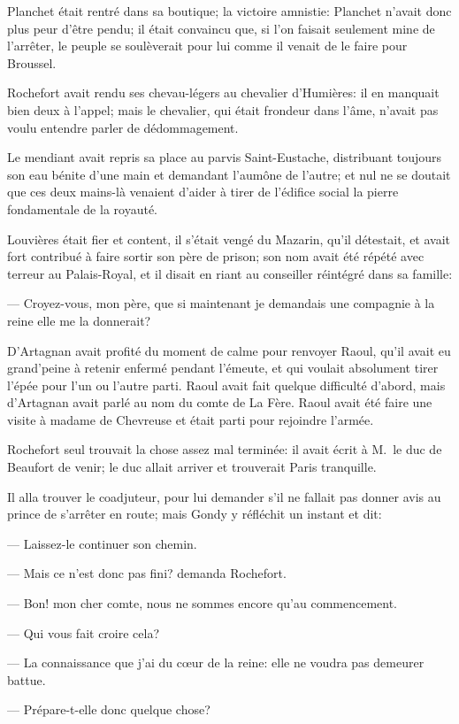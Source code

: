 Planchet était rentré dans sa boutique; la victoire amnistie: Planchet n'avait donc plus peur d'être pendu; il était convaincu que, si l'on faisait seulement mine de l'arrêter, le peuple se soulèverait pour lui comme il venait de le faire pour Broussel.

Rochefort avait rendu ses chevau-légers au chevalier d'Humières: il en manquait bien deux à l'appel; mais le chevalier, qui était frondeur dans l'âme, n'avait pas voulu entendre parler de dédommagement.

Le mendiant avait repris sa place au parvis Saint-Eustache, distribuant toujours son eau bénite d'une main et demandant l'aumône de l'autre; et nul ne se doutait que ces deux mains-là venaient d'aider à tirer de l'édifice social la pierre fondamentale de la royauté.

Louvières était fier et content, il s'était vengé du Mazarin, qu'il détestait, et avait fort contribué à faire sortir son père de prison; son nom avait été répété avec terreur au Palais-Royal, et il disait en riant au conseiller réintégré dans sa famille:

— Croyez-vous, mon père, que si maintenant je demandais une compagnie à la reine elle me la donnerait?

D'Artagnan avait profité du moment de calme pour renvoyer Raoul, qu'il avait eu grand'peine à retenir enfermé pendant l'émeute, et qui voulait absolument tirer l'épée pour l'un ou l'autre parti. Raoul avait fait quelque difficulté d'abord, mais d'Artagnan avait parlé au nom du comte de La Fère. Raoul avait été faire une visite à madame de Chevreuse et était parti pour rejoindre l'armée.

Rochefort seul trouvait la chose assez mal terminée: il avait écrit à M.~le duc de Beaufort de venir; le duc allait arriver et trouverait Paris tranquille.

Il alla trouver le coadjuteur, pour lui demander s'il ne fallait pas donner avis au prince de s'arrêter en route; mais Gondy y réfléchit un instant et dit:

— Laissez-le continuer son chemin.

— Mais ce n'est donc pas fini? demanda Rochefort.

— Bon! mon cher comte, nous ne sommes encore qu'au commencement.

— Qui vous fait croire cela?

— La connaissance que j'ai du cœur de la reine: elle ne voudra pas demeurer battue.

— Prépare-t-elle donc quelque chose?

